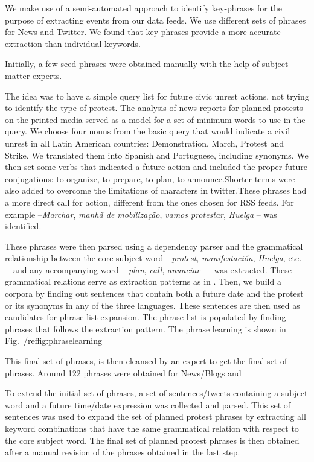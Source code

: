 We make use of a semi-automated approach to identify key-phrases for the purpose of extracting events from our data feeds. We use different sets of phrases for News and Twitter. We found that key-phrases provide a more accurate extraction than individual keywords.

Initially, a few seed phrases were obtained manually
with the help of subject matter experts. 


The idea was to have a simple query list for future civic unrest actions, not trying to identify the type of protest. The analysis of news reports for planned protests on the printed media served as a model for a set of minimum words to use in the query.
We choose four nouns from the basic query that would indicate a civil unrest in all Latin American countries: Demonstration, March, Protest and Strike. We translated them into Spanish and Portuguese, including synonyms.
We then set some verbs that indicated a future action and included the proper future conjugations: to organize, to prepare, to plan, to announce.Shorter terms were also added to overcome the limitations of characters in twitter.These phrases had a more direct call for action, different from the ones chosen for RSS feeds. For example --{\em Marchar}, {\em manhã de mobilização}, {\em vamos  protestar}, {\em Huelga} -- was identified.

These phrases were then parsed
using a dependency parser and the grammatical relationship between the
core subject word---{\em protest}, {\em manifestación}, {\em Huelga},
etc.---and any accompanying word -- {\em plan}, {\em call}, {\em anunciar} --- was extracted. These grammatical relations serve as extraction patterns as in \cite{riloff2003learning}. Then, we build a corpora by finding out sentences that contain both a future date and the protest or its synonyms in any of the three languages. These sentences are then used as candidates for phrase list expansion. The phrase list is populated by finding phrases that follows the extraction pattern.
The phrase learning is shown in Fig.~/ref{fig:phraselearning}

This final set of phrases, is then cleansed by an expert to get the final set of phrases. Around 122 phrases were obtained for News/Blogs and 

To extend the initial set of phrases, a set of sentences/tweets containing a subject word and a
future time/date expression was collected and parsed.  This set of
sentences was used to expand the set of planned protest phrases by
extracting all keyword combinations that have the same grammatical
relation with respect to the core subject word. The final set of
planned protest phrases is then obtained after a manual revision of
the phrases obtained in the last step.

